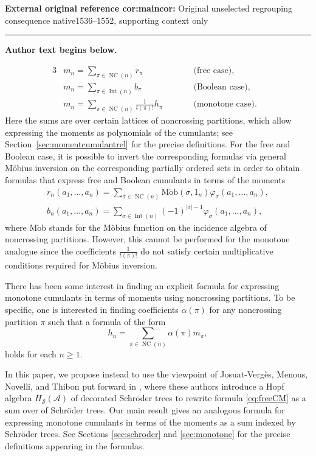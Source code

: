 \documentclass[11pt]{article}
\numberwithin{equation}{section}
\numberwithin{equation}{section}
\newcommand{\A}{\mathcal{A}}
\newcommand{\NC}{\operatorname{NC}}
\newcommand{\Int}{\operatorname{Int}}
\newcommand{\cHS}{H_\mathcal{S}}
\begin{document}
\noindent\textbf{External original reference cor:maincor:} Original unselected regrouping consequence native1536–1552, supporting context only\par
\medskip\hrule\medskip\noindent\textbf{Author text begins below.}\par
\setcounter{section}{1}\setcounter{equation}{0}
\begin{alignat*}{3}
& m_n = \sum_{\pi\in \NC(n)} r_\pi \qquad && \text{(free case)},& \\
& m_n = \sum_{\pi\in \Int(n)} b_\pi \qquad && \text{(Boolean case)}, &\\
& m_n = \sum_{\pi\in \NC(n)} \frac{1}{t(\pi)! }h_\pi \qquad && \text{(monotone case)}.&
\end{alignat*}
Here the sums are over certain lattices of noncrossing partitions, which allow expressing the moments as polynomials of the cumulants; see Section~\ref{sec:momentcumulantrel} for the precise definitions. For the free and Boolean case, it is possible to invert the corresponding formulas via general M\"obius inversion on the corresponding partially ordered sets in order to obtain formulas that express free and Boolean cumulants in terms of the moments
\begin{gather}
	\label{eq:freeCM}
	r_n(a_1,\dots,a_n)
	= \sum_{\sigma \in \NC(n)} \operatorname{M\ddot{o}b}(\sigma,1_n)\varphi_\sigma(a_1,\dots,a_n),
	\\ \label{eq:BoolCM}
	b_n(a_1,\dots,a_n)
	= \sum_{\sigma \in \Int(n)}(-1)^{|\sigma|-1}\varphi_\sigma(a_1,\dots,a_n),
\end{gather}
where $\mathrm{M\ddot{o}b}$ stands for the M\"obius function on the incidence algebra of noncrossing partitions. However, this cannot be performed for the monotone analogue since the coefficients $\frac{1}{t(\pi)!}$ do not satisfy certain multiplicative conditions required for M\"obius inversion.

There has been some interest in finding an explicit formula for expressing monotone cumulants in terms of moments using noncrossing partitions. To be specific, one is interested in finding coefficients $\alpha(\pi)$ for any noncrossing partition $\pi$ such that a formula of the form
\begin{equation}\label{eq:objective}
h_n = \sum_{\pi\in \NC(n)} \alpha(\pi)m_\pi,
\end{equation}
holds for each $n\geq 1$.

\setcounter{section}{1}\setcounter{equation}{3}
In this paper, we propose instead to use the viewpoint of Josuat-Verg\`es, Menous, Novelli, and Thibon put forward in \cite{JMNT}, where these authors introduce a Hopf algebra $\cHS(\A)$ of decorated Schr\"oder trees to rewrite formula \eqref{eq:freeCM} as a sum over of Schr\"oder trees. Our main result gives an analogous formula for expressing monotone cumulants in terms of the moments as a sum indexed by Schr\"oder trees. See Sections \ref{sec:schroder} and \ref{sec:monotone} for the precise definitions appearing in the formulas.
\end{document}

